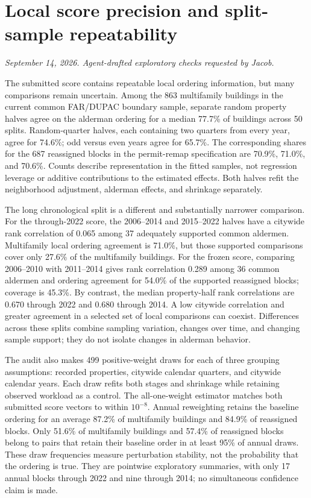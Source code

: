 \clearpage
\section*{Local score precision and split-sample repeatability}
\textit{September 14, 2026. Agent-drafted exploratory checks requested by Jacob.}

The submitted score contains repeatable local ordering information, but many comparisons remain uncertain. Among the 863 multifamily buildings in the current common FAR/DUPAC boundary sample, separate random property halves agree on the alderman ordering for a median 77.7\% of buildings across 50 splits. Random-quarter halves, each containing two quarters from every year, agree for 74.6\%; odd versus even years agree for 65.7\%. The corresponding shares for the 687 reassigned blocks in the permit-remap specification are 70.9\%, 71.0\%, and 70.6\%. Counts describe representation in the fitted samples, not regression leverage or additive contributions to the estimated effects. Both halves refit the neighborhood adjustment, alderman effects, and shrinkage separately.

The long chronological split is a different and substantially narrower comparison. For the through-2022 score, the 2006--2014 and 2015--2022 halves have a citywide rank correlation of 0.065 among 37 adequately supported common aldermen. Multifamily local ordering agreement is 71.0\%, but those supported comparisons cover only 27.6\% of the multifamily buildings. For the frozen score, comparing 2006--2010 with 2011--2014 gives rank correlation 0.289 among 36 common aldermen and ordering agreement for 54.0\% of the supported reassigned blocks; coverage is 45.3\%. By contrast, the median property-half rank correlations are 0.670 through 2022 and 0.680 through 2014. A low citywide correlation and greater agreement in a selected set of local comparisons can coexist. Differences across these splits combine sampling variation, changes over time, and changing sample support; they do not isolate changes in alderman behavior.

The audit also makes 499 positive-weight draws for each of three grouping assumptions: recorded properties, citywide calendar quarters, and citywide calendar years. Each draw refits both stages and shrinkage while retaining observed workload as a control. The all-one-weight estimator matches both submitted score vectors to within $10^{-8}$. Annual reweighting retains the baseline ordering for an average 87.2\% of multifamily buildings and 84.9\% of reassigned blocks. Only 51.6\% of multifamily buildings and 57.4\% of reassigned blocks belong to pairs that retain their baseline order in at least 95\% of annual draws. These draw frequencies measure perturbation stability, not the probability that the ordering is true. They are pointwise exploratory summaries, with only 17 annual blocks through 2022 and nine through 2014; no simultaneous confidence claim is made.

